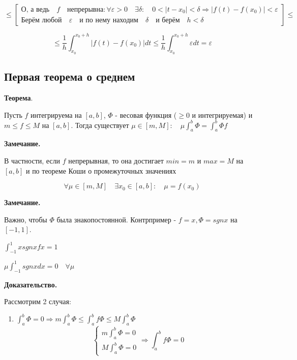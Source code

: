\documentclass[a4paper]{article}
\begin{document}
\begin{definit}
\begin{hproof}
\[
 \leq \begin{bmatrix}
 \text{О, а ведь} \quad f \quad \text{непрерывна}: \forall \varepsilon > 0 \quad \exists \delta: \quad 0 < |t-x_0| < \delta \Rightarrow |f(t)-f(x_0)| < \varepsilon \\
 \text{Берём любой} \quad \varepsilon \quad \text{и по нему находим} \quad \delta \quad \text{и берём} \quad h < \delta 
 \end{bmatrix} \leq 
\]

\[
\leq \frac{1}{h} \int_{x_0}^{x_0+h} |f(t) - f(x_0)| dt \leq \frac{1}{h} \int_{x_0}^{x_0+h} \varepsilon dt = \varepsilon
\]
\end{hproof}
\end{definit}

\begin{definit}
\hypertarget{p18}{}
\subsection*{Первая теорема о среднем}

\begin{htheorem}\textbf{Теорема}.

Пусть $f$ интегрируема на $[a,b]$, $\Phi$ - весовая функция ($\geq 0$ и интегрируемая) \newline и $m \leq f \leq M$ на $[a,b]$. Тогда существует $\mu \in [m, M]: \quad \mu \int_a^b \Phi = \int_a^b \Phi f$

\textbf{Замечание.}

В частности, если $f$ непрерывная, то она достигает $min = m$ и $max = M$ на $[a,b]$ и по теореме Коши о промежуточных значениях

\[
\forall \mu \in [m,M] \quad \exists x_0 \in [a,b]: \quad \mu = f(x_0)
\]

\textbf{Замечание.}

Важно, чтобы $\Phi$ была знакопостоянной. Контрпример - $f = x, \Phi = sgn x$ на $[-1,1]$.

$\int_{-1}^1 x sgn x fx = 1$

$\mu \int_{-1}^1 sgn x dx = 0 \quad \forall \mu$
\end{htheorem}

\begin{hproof}\textbf{Доказательство.}

Рассмотрим 2 случая:
\begin{enumerate}
\item $\int_a^b \Phi = 0 \Rightarrow  m \int_a^b \Phi \leq \int_a^b f \Phi \leq M \int_a^b \Phi$
\[
\begin{cases}
m \int_a^b \Phi = 0 \\ M \int_a^b \Phi = 0
\end{cases} \Rightarrow \int_a^b f \Phi = 0
\]


\end{enumerate}
\end{hproof}
\end{definit}
\end{document}
